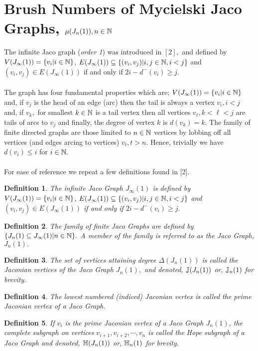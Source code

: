 \documentclass[11pt]{article}
\numberwithin{equation}{section}
\newtheorem{definition}{Definition}[section]
\begin{document}
{\section{Brush Numbers of Mycielski Jaco Graphs, $\mu(J_n(1)), n \in \Bbb N$}
The infinite Jaco graph (\emph{order 1}) was introduced in $[2],$ and defined by $V(J_\infty(1)) = \{v_i| i \in \Bbb N\}$, $E(J_\infty(1)) \subseteq \{(v_i, v_j)| i, j \in \Bbb N, i< j\}$ and $(v_i,v_ j) \in E(J_\infty(1))$ if and only if $2i - d^-(v_i) \geq j.$\\ \\ The graph has four fundamental properties which are; $V(J_\infty(1)) = \{v_i|i \in \Bbb N\}$ and, if $v_j$ is the head of an edge (arc) then the tail is always a vertex $v_i, i<j$ and, if $v_k,$ for smallest $k \in \Bbb N$ is a tail vertex then all vertices $v_ \ell, k< \ell<j$ are tails of arcs to $v_j$ and finally, the degree of vertex $k$ is $d(v_k) = k.$ The family of finite directed graphs are those limited to $n \in \Bbb N$ vertices by lobbing off all vertices (and edges arcing to vertices) $v_t, t > n.$ Hence, trivially we have $d(v_i) \leq i$ for $i \in \Bbb N.$\\ \\
For ease of reference we repeat a few definitions found in [2].
\begin{definition}
The infinite Jaco Graph $J_\infty(1)$ is defined by $V(J_\infty(1)) = \{v_i| i \in \Bbb N\}$, $E(J_\infty(1)) \subseteq \{(v_i, v_j)| i, j \in \Bbb N, i< j\}$ and $(v_i,v_ j) \in E(J_\infty(1))$ if and only if $2i - d^-(v_i) \geq j.$
\end{definition}
\begin{definition}
The family of finite Jaco Graphs are defined by $\{J_n(1) \subseteq J_\infty(1)|n\in \Bbb {N}\}.$ A member of the family is referred to as the Jaco Graph, $J_n(1).$
\end{definition}
\begin{definition}
The set of vertices attaining degree $\Delta (J_n(1))$ is called the Jaconian vertices of the Jaco Graph $J_n(1),$ and denoted, $\Bbb{J}(J_n(1))$ or, $\Bbb{J}_n(1)$ for brevity.
\end{definition}
\begin{definition}
The lowest numbered (indiced) Jaconian vertex is called the prime Jaconian vertex of a Jaco Graph.
\end{definition}
\begin{definition}
If $v_i$ is the prime Jaconian vertex of a Jaco Graph $J_n(1)$, the complete subgraph on vertices $v_{i+1}, v_{i+2}, \cdots,v_n$ is called the Hope subgraph of a Jaco Graph and denoted,  $\Bbb{H}(J_n(1))$ or, $\Bbb{H}_n(1)$ for brevity.

\end{definition}}
\end{document}
